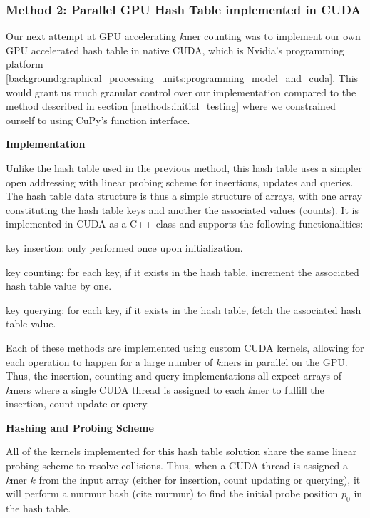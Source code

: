 \subsubsection{Method 2: Parallel GPU Hash Table implemented in CUDA}
Our next attempt at GPU accelerating \textit{k}mer counting was to implement our own GPU accelerated hash table in native CUDA, which is Nvidia's programming platform \ref{background:graphical_processing_units:programming_model_and_cuda}.
This would grant us much granular control over our implementation compared to the method described in section \ref{methods:initial_testing} where we constrained ourself to using CuPy's function interface.

\textbf{\large{Implementation}}

Unlike the hash table used in the previous method, this hash table uses a simpler open addressing with linear probing scheme for insertions, updates and queries.
The hash table data structure is thus a simple structure of arrays, with one array constituting the hash table keys and another the associated values (counts).
It is implemented in CUDA as a C++ class and supports the following functionalities:
\begin{compactitem}
  \item key insertion: only performed once upon initialization.
  \item key counting: for each key, if it exists in the hash table, increment the associated hash table value by one.
  \item key querying: for each key, if it exists in the hash table, fetch the associated hash table value.
\end{compactitem}

Each of these methods are implemented using custom CUDA kernels, allowing for each operation to happen for a large number of \textit{k}mers in parallel on the GPU.
Thus, the insertion, counting and query implementations all expect arrays of \textit{k}mers where a single CUDA thread is assigned to each \textit{k}mer to fulfill the insertion, count update or query.

\textbf{Hashing and Probing Scheme}

All of the kernels implemented for this hash table solution share the same linear probing scheme to resolve collisions.
Thus, when a CUDA thread is assigned a \textit{k}mer $k$ from the input array (either for insertion, count updating or querying), it will perform a murmur hash (cite murmur) to find the initial probe position $p_0$ in the hash table.

